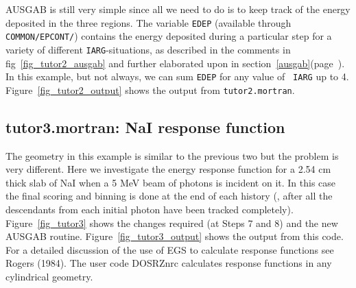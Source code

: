 \begin{latexonly}

\end{latexonly}
\begin{htmlonly}
\clearpage

\clearpage
\end{htmlonly}

AUSGAB is still very simple since all we need to do is to keep track
of the energy deposited in the three regions.  The variable {\tt EDEP}
(available through {\tt COMMON/EPCONT/}) contains the energy deposited
during a particular step for a variety of different {\tt IARG}-situations,
as described in the comments in fig~\ref{fig_tutor2_ausgab} and further
elaborated upon in section~\ref{ausgab}(page~\pageref{ausgab}).  In this
example, but not always, we can sum {\tt EDEP} for any value of {\tt
IARG} up to 4.  Figure~\ref{fig_tutor2_output} shows the output from
{\tt tutor2.mortran}.

\newpage 

\begin{latexonly}
%

\end{latexonly}
\clearpage 
\begin{htmlonly}
\clearpage

\clearpage
\end{htmlonly}

\subsection{tutor3.mortran: NaI response function} 


The geometry in  this  example is similar to the previous two but the
problem is very different.  Here we investigate the energy response
function for a 2.54 cm thick slab of NaI when a 5 MeV beam of photons
is incident on it.  In  this case the final scoring and binning is
done at the end of each history (\ie , after all the descendants
from each initial photon have been tracked completely).
Figure~\ref{fig_tutor3}
shows the changes required (at Steps 7 and 8) and the new AUSGAB
routine. Figure~\ref{fig_tutor3_output} shows the output from this code.
For a detailed discussion of the use of EGS to calculate response functions
see Rogers (1984)\cite{Ro82}.  The user code DOSRZnrc calculates response
functions in any cylindrical geometry\cite{Ro00}.



